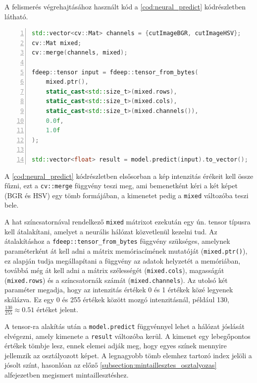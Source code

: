 \par A felismerés végrehajtásához használt kód a \ref{cod:neural_predict} kódrészletben látható.

\begin{codewrapper}
\begin{lstlisting}[language=C++, numbers=left, caption={A neurális hálóval történő osztályozás menete.}, label={cod:neural_predict}]
std::vector<cv::Mat> channels = {cutImageBGR, cutImageHSV};
cv::Mat mixed;
cv::merge(channels, mixed);

fdeep::tensor input = fdeep::tensor_from_bytes(
    mixed.ptr(),
    static_cast<std::size_t>(mixed.rows),
    static_cast<std::size_t>(mixed.cols),
    static_cast<std::size_t>(mixed.channels()),
    0.0f,
    1.0f
);

std::vector<float> result = model.predict(input).to_vector();
\end{lstlisting}
\end{codewrapper}

\par A \ref{cod:neural_predict} kódrészletben elsősorban a kép intenzitás érékeit kell össze fűzni, ezt a \lstinline{cv::merge} függvény\cite{opencv_docs} teszi meg, ami bemenetként kéri a két képet (BGR és HSV) egy tömb formájában, a kimenetet pedig a \lstinline{mixed} változóba teszi bele.
\par A hat színcsatornával rendelkező \lstinline{mixed} mátrixot ezekután egy ún. tensor típusra kell átalakítani, amelyet a neurális hálózat közvetlenül kezelni tud. Az átalakításhoz a \lstinline{fdeep::tensor_from_bytes} függvény\cite{frugally_deep2016} szükséges, amelynek paraméterként át kell adni a mátrix memóriacímének mutatóját (\lstinline{mixed.ptr()}), ez alapján tudja megállapítani a függvény az adatok helyzetét a memóriában, továbbá még át kell adni a mátrix szélességét (\lstinline{mixed.cols}), magasságát (\lstinline{mixed.rows}) és a színcsatornák számát (\lstinline{mixed.channels}). Az utolsó két paraméter megadja, hogy az intenzitás értékek 0 és 1 értékek közé legyenek skálázva. Ez egy 0 és 255 értékek között mozgó intenzitásnál, például 130, $\frac{130}{255} \approx 0.51$ értéket jelent.
\par A tensor-ra alakítás után a \lstinline{model.predict} függvénnyel\cite{frugally_deep2016} lehet a hálózat jóslását elvégezni, amely kimenete a \lstinline{result} változóba kerül. A kimenet egy lebegőpontos értékek tömbje lesz, ennek elemei adják meg, hogy egyes színek mennyire jellemzik az osztályozott képet. A legnagyobb tömb elemhez tartozó index jelöli a jósolt színt, hasonlóan az előző \ref{subsection:mintaillesztes_osztalyozas} alfejezetben megismert mintaillesztéshez.

